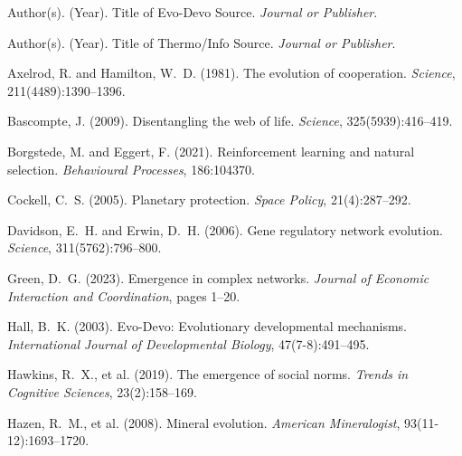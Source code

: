\documentclass[12pt,openany]{book}
\begin{document}

\begin{thebibliography}{}

Author(s). (Year).
\newblock Title of Evo-Devo Source.
\newblock \emph{Journal or Publisher}.

Author(s). (Year).
\newblock Title of Thermo/Info Source.
\newblock \emph{Journal or Publisher}.

Axelrod, R. and Hamilton, W.~D. (1981).
\newblock The evolution of cooperation.
\newblock \emph{Science}, 211(4489):1390--1396.

Bascompte, J. (2009).
\newblock Disentangling the web of life.
\newblock \emph{Science}, 325(5939):416--419.

Borgstede, M. and Eggert, F. (2021).
\newblock Reinforcement learning and natural selection.
\newblock \emph{Behavioural Processes}, 186:104370.

Cockell, C.~S. (2005).
\newblock Planetary protection.
\newblock \emph{Space Policy}, 21(4):287--292.

Davidson, E.~H. and Erwin, D.~H. (2006).
\newblock Gene regulatory network evolution.
\newblock \emph{Science}, 311(5762):796--800.

Green, D.~G. (2023).
\newblock Emergence in complex networks.
\newblock \emph{Journal of Economic Interaction and Coordination}, pages 1--20.

Hall, B.~K. (2003).
\newblock Evo-Devo: Evolutionary developmental mechanisms.
\newblock \emph{International Journal of Developmental Biology}, 47(7-8):491--495.

Hawkins, R.~X., et al. (2019).
\newblock The emergence of social norms.
\newblock \emph{Trends in Cognitive Sciences}, 23(2):158--169.

Hazen, R.~M., et al. (2008).
\newblock Mineral evolution.
\newblock \emph{American Mineralogist}, 93(11-12):1693--1720.


\end{thebibliography}
\end{document}
